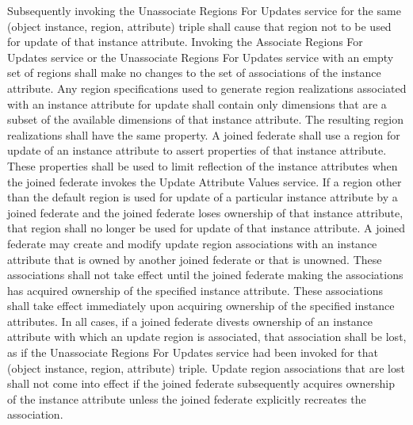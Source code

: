 \begin{compactstdpage}

    Subsequently invoking the Unassociate Regions For Updates service for the same (object instance, region, attribute) triple shall cause that region not to be used for update of that instance attribute. Invoking the Associate Regions For Updates service or the Unassociate Regions For Updates service with an empty set of regions shall make no changes to the set of associations of the instance attribute. Any region specifications used to generate region realizations associated with an instance attribute for update shall contain only dimensions that are a subset of the available dimensions of that instance attribute. The resulting region realizations shall have the same property. A joined federate shall use a region for update of an instance attribute to assert properties of that instance attribute. These properties shall be used to limit reflection of the instance attributes when the joined federate invokes the Update Attribute Values service. If a region other than the default region is used for update of a particular instance attribute by a joined federate and the joined federate loses ownership of that instance attribute, that region shall no longer be used for update of that instance attribute. A joined federate may create and modify update region associations with an instance attribute that is owned by another joined federate or that is unowned. These associations shall not take effect until the joined federate making the associations has acquired ownership of the specified instance attribute. These associations shall take effect immediately upon acquiring ownership of the specified instance attributes. In all cases, if a joined federate divests ownership of an instance attribute with which an update region is associated, that association shall be lost, as if the Unassociate Regions For Updates service had been invoked for that (object instance, region, attribute) triple. Update region associations that are lost shall not come into effect if the joined federate subsequently acquires ownership of the instance attribute unless the joined federate explicitly recreates the association.


\end{compactstdpage}
